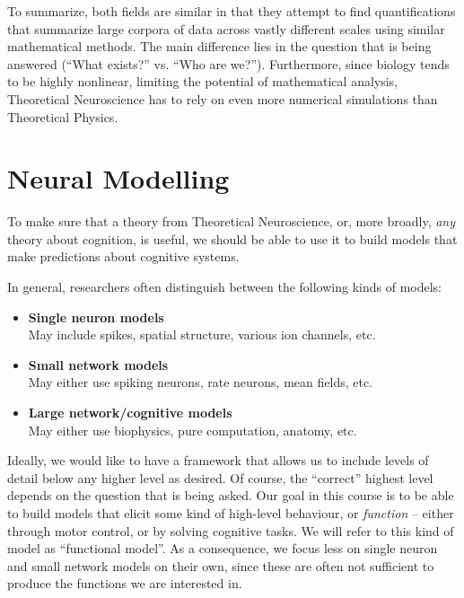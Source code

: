 \documentclass[10pt,letterpaper,oneside]{article}
\begin{document}
To summarize, both fields are similar in that they attempt to find quantifications that summarize large corpora of data across vastly different scales using similar mathematical methods. The main difference lies in the question that is being answered (\enquote{What exists?} vs. \enquote{Who are we?}). Furthermore, since biology tends to be highly nonlinear, limiting the potential of mathematical analysis, Theoretical Neuroscience has to rely on even more numerical simulations than Theoretical Physics.

\section{Neural Modelling}

To make sure that a theory from Theoretical Neuroscience, or, more broadly, \emph{any} theory about cognition, is useful, we should be able to use it to build models that make predictions about cognitive systems.


In general, researchers often distinguish between the following kinds of models:
\begin{itemize}
	\item \textbf{Single neuron models}\\
	May include spikes, spatial structure, various ion channels, etc.
	\item \textbf{Small network models}\\
	May either use spiking neurons, rate neurons, mean fields, etc.
	\item \textbf{Large network/cognitive models}\\
	May either use biophysics, pure computation, anatomy, etc.
\end{itemize}
Ideally, we would like to have a framework that allows us to include levels of detail below any higher level as desired. Of course, the \enquote{correct} highest level depends on the question that is being asked. Our goal in this course is to be able to build models that elicit some kind of high-level behaviour, or \emph{function} -- either through motor control, or by solving cognitive tasks. We will refer to this kind of model as \enquote{functional model}. As a consequence, we focus less on single neuron and small network models on their own, since these are often not sufficient to produce the functions we are interested in.
\end{document}
